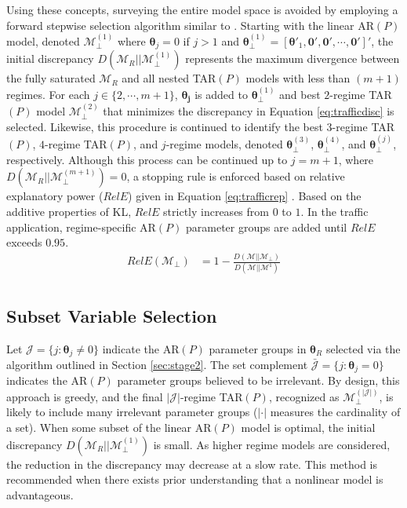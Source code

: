 Using these concepts, surveying the entire model space is avoided by employing a forward stepwise selection algorithm similar to \cite{Piironen2015}. Starting with the linear AR$(P)$ model, denoted $\mathcal{M}^{(1)}_{\perp}$ where $\bm{\theta}_j=0$ if $j>1$ and $\bm{\theta}^{(1)}_\perp=[\bm{\theta}'_1,\bm{0}',\bm{0}',\cdots,\bm{0}']'$, the initial discrepancy $D(\mathcal{M}_{R}||\mathcal{M}^{(1)}_{\perp})$ represents the maximum divergence between the fully saturated $\mathcal{M}_R$ and all nested TAR$(P)$ models with less than $(m+1)$ regimes. For each $j \in \{2,\cdots,m+1\}$, $\bm{\theta_j}$ is added to $\bm{\theta}^{(1)}_\perp$ and best $2$-regime TAR$(P)$ model $\mathcal{M}^{(2)}_\perp$ that minimizes the discrepancy in Equation \ref{eq:trafficdisc} is selected. Likewise, this procedure is continued to identify the best $3$-regime TAR$(P)$, $4$-regime TAR$(P)$, and $j$-regime models, denoted $\bm{\theta}^{(3)}_\perp$, $\bm{\theta}^{(4)}_\perp$, and $\bm{\theta}^{(j)}_\perp$, respectively. Although this process can be continued up to $j=m+1$, where 
$D(\mathcal{M}_{R}||\mathcal{M}^{(m+1)}_{\perp})=0$, a stopping rule is enforced based on relative explanatory power ($RelE$) given in Equation \ref{eq:trafficrep} \citep{Dupuis2003}. Based on the additive properties of KL, $RelE$ strictly increases from $0$ to $1$. In the traffic application, regime-specific AR$(P)$ parameter groups are added until $RelE$ exceeds $0.95$.
\begin{equation}
\label{eq:trafficrep}
\begin{split}
RelE(\mathcal{M}_\perp)&=1-\frac{D(\mathcal{M}||\mathcal{M}_\perp)}{D(\mathcal{M}||\mathcal{M}^1)}\\
\end{split}
\end{equation}


\subsection{Subset Variable Selection}
\label{sec:stage3}

Let $\mathcal{J}=\{j: \bm{\theta}_j \neq 0\}$ indicate the AR$(P)$ parameter groups in $\bm{\theta}_R$ selected via the algorithm outlined in Section \ref{sec:stage2}. The set complement $\bar{\mathcal{J}}=\{j: \bm{\theta}_j = 0\}$ indicates the AR$(P)$ parameter groups believed to be irrelevant. By design, this approach is greedy, and the final $|\mathcal{J}|$-regime TAR$(P)$, recognized as $\mathcal{M}^{(|\mathcal{J}|)}_\perp$, is likely to include many irrelevant parameter groups ($|\cdot|$ measures the cardinality of a set). When some subset of the linear AR$(P)$ model is optimal, the initial discrepancy  $D(\mathcal{M}_{R}||\mathcal{M}^{(1)}_{\perp})$ is small. As higher regime models are considered, the reduction in the discrepancy may decrease at a slow rate. This method is recommended when there exists prior understanding that a nonlinear model is advantageous.

